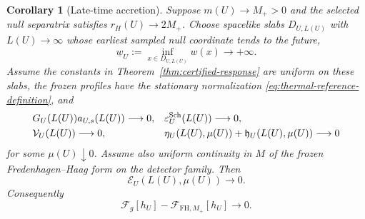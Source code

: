\documentclass[11pt,a4paper]{article}
\newtheorem{corollary}[theorem]{Corollary}
\theoremstyle{definition}
\theoremstyle{remark}
\begin{document}
	\begin{corollary}[Late-time accretion]
		\label{cor:accretion}
		Suppose $m(U)\to M_+>0$ and the selected null separatrix satisfies
		$r_H(U)\to2M_+$.  Choose spacelike slabs $D_{U,L(U)}$ with
		$L(U)\to\infty$ whose earliest sampled null coordinate tends to the future,
		\begin{equation}
			\underline w_U:=\inf_{x\in D_{U,L(U)}}w(x)\longrightarrow+\infty.
		\end{equation}
		Assume the constants in Theorem~\ref{thm:certified-response} are uniform on
		these slabs, the frozen profiles have the stationary normalization
		\eqref{eq:thermal-reference-definition}, and
		\begin{align}
			&G_U(L(U))a_{U,s}(L(U))\longrightarrow0,
			&&\varepsilon_U^{\mathrm{Sch}}(L(U))\longrightarrow0,\notag\\
			&\mathcal V_U(L(U))\longrightarrow0,
			&&\eta_U(L(U),\mu(U))+\mathfrak h_U(L(U),\mu(U))\longrightarrow0
			\label{eq:accretion-vanishing-assumptions}
		\end{align}
		for some $\mu(U)\downarrow0$.  Assume also uniform continuity in $M$ of the
		frozen Fredenhagen--Haag form on the detector family.  Then
		\begin{equation}
			\mathcal E_U(L(U),\mu(U))\to0.
		\end{equation}
		Consequently
		\begin{equation}
			\mathcal F_g[h_U]-\mathcal F_{\mathrm{FH},M_+}[h_U]\longrightarrow0.
			\label{eq:accretion-limit}
		\end{equation}
	\end{corollary}
	
\end{document}
